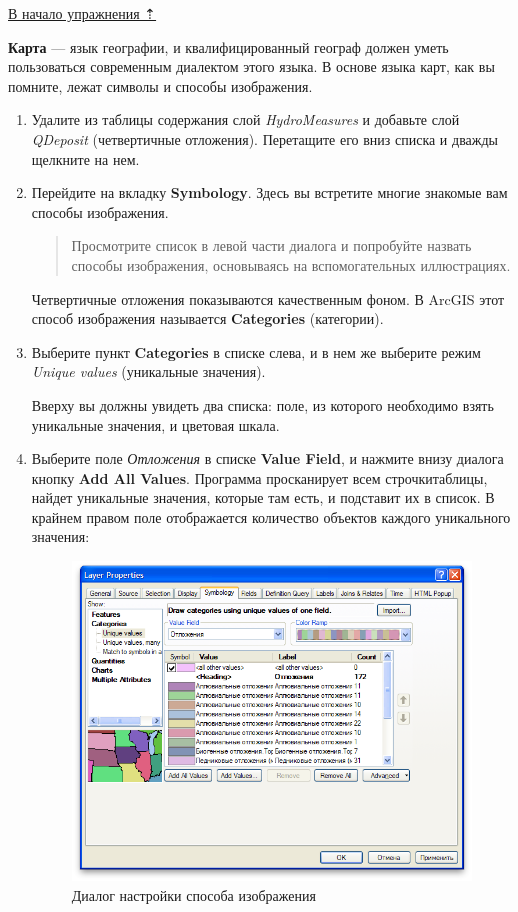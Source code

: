 \documentclass[12pt,]{book}
\begin{document}
\protect\hyperlink{map-design-quaternary}{В начало упражнения ⇡}

\textbf{Карта} --- язык географии, и квалифицированный географ должен уметь пользоваться современным диалектом этого языка. В основе языка карт, как вы помните, лежат символы и способы изображения.

\begin{enumerate}
\def\labelenumi{\arabic{enumi}.}
\item
  Удалите из таблицы содержания слой \emph{HydroMeasures} и добавьте слой \emph{QDeposit} (четвертичные отложения). Перетащите его вниз списка и дважды щелкните на нем.
\item
  Перейдите на вкладку \textbf{Symbology}. Здесь вы встретите многие знакомые вам способы изображения.

  \begin{quote}
  Просмотрите список в левой части диалога и попробуйте назвать способы изображения, основываясь на вспомогательных иллюстрациях.
  \end{quote}

  Четвертичные отложения показываются качественным фоном. В ArcGIS этот способ изображения называется \textbf{Categories} (категории).
\item
  Выберите пункт \textbf{Categories} в списке слева, и в нем же выберите режим \emph{Unique values} (уникальные значения).

  Вверху вы должны увидеть два списка: поле, из которого необходимо взять уникальные значения, и цветовая шкала.
\item
  Выберите поле \emph{Отложения} в списке \textbf{Value Field}, и нажмите внизу диалога кнопку \textbf{Add All Values}. Программа просканирует всем строчкитаблицы, найдет уникальные значения, которые там есть, и подставит их в список. В крайнем правом поле отображается количество объектов каждого уникального значения:

  \begin{figure}
  \centering
  \includegraphics{images/Ex01/image15.png}
  \caption{Диалог настройки способа изображения}
  \end{figure}


\end{enumerate}
\end{document}
